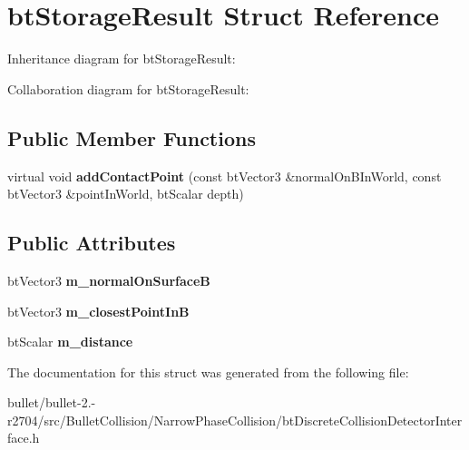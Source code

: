 \hypertarget{structbt_storage_result}{\section{bt\+Storage\+Result Struct Reference}
\label{structbt_storage_result}
}


Inheritance diagram for bt\+Storage\+Result\+:


Collaboration diagram for bt\+Storage\+Result\+:
\subsection*{Public Member Functions}
\begin{DoxyCompactItemize}
\item 
\hypertarget{structbt_storage_result_a81f65a5d0d472448e8bf1a1bb407984d}{virtual void {\bfseries add\+Contact\+Point} (const bt\+Vector3 \&normal\+On\+B\+In\+World, const bt\+Vector3 \&point\+In\+World, bt\+Scalar depth)}\label{structbt_storage_result_a81f65a5d0d472448e8bf1a1bb407984d}

\end{DoxyCompactItemize}
\subsection*{Public Attributes}
\begin{DoxyCompactItemize}
\item 
\hypertarget{structbt_storage_result_a8faa8494247b040e39588f5671b117ef}{bt\+Vector3 {\bfseries m\+\_\+normal\+On\+Surface\+B}}\label{structbt_storage_result_a8faa8494247b040e39588f5671b117ef}

\item 
\hypertarget{structbt_storage_result_a92e4f48a71800672aff7c07d06a43022}{bt\+Vector3 {\bfseries m\+\_\+closest\+Point\+In\+B}}\label{structbt_storage_result_a92e4f48a71800672aff7c07d06a43022}

\item 
\hypertarget{structbt_storage_result_ad0c02fb0f5cffbd21b0857dab0b370fc}{bt\+Scalar {\bfseries m\+\_\+distance}}\label{structbt_storage_result_ad0c02fb0f5cffbd21b0857dab0b370fc}

\end{DoxyCompactItemize}


The documentation for this struct was generated from the following file\+:\begin{DoxyCompactItemize}
\item 
bullet/bullet-\/2.-\/r2704/src/\+Bullet\+Collision/\+Narrow\+Phase\+Collision/bt\+Discrete\+Collision\+Detector\+Interface.\+h\end{DoxyCompactItemize}
